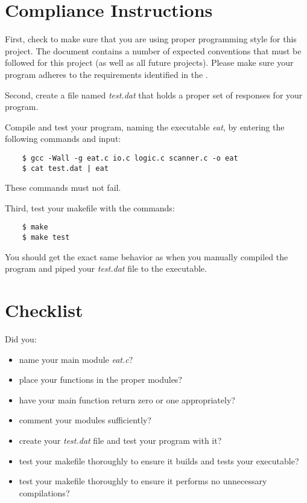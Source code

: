 \documentclass[12pt]{article}
\begin{document}
\section*{Compliance Instructions}

First, check to make sure that you are using proper programming
style for this project.  The document
 contains a number of expected
conventions that must be followed for this project (as well as all
future projects).  Please make sure your program adheres to the
requirements identified in the 
.

Second, create a file named {\it test.dat} that holds a proper set of responses 
for your program.

Compile and test your program, naming the executable {\it eat}, by entering
the following commands and input:

\begin{verbatim}
    $ gcc -Wall -g eat.c io.c logic.c scanner.c -o eat
    $ cat test.dat | eat
\end{verbatim}

These commands must not fail.

Third, test your makefile with the commands:

\begin{verbatim}
    $ make
    $ make test
\end{verbatim}

You should get the exact same behavior as when you manually compiled the
program and piped your {\it test.dat} file to the executable.

\section*{Checklist}

Did you:

\begin{itemize}
\item
    name your main module {\it eat.c}?
\item
    place your functions in the proper modules?
\item
    have your main function return zero or one appropriately?
\item
    comment your modules sufficiently?
\item
    create your {\it test.dat} file and test your program with it?
\item
    test your makefile thoroughly
    to ensure it builds and tests your executable?
\item
    test your makefile thoroughly
    to ensure it performs no unnecessary compilations?
\end{itemize}
\end{document}
